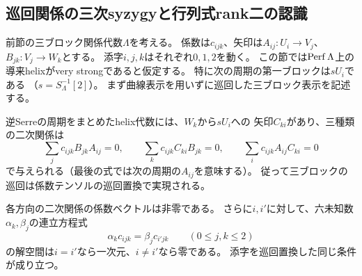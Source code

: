 \subsection{巡回関係の三次syzygyと行列式rank二の認識}
\label{subsec:ou-cyclic-determinants}

前節の三ブロック関係代数$\Lambda$を考える。
係数は$c_{ijk}$、矢印は$A_{ij}:U_i\to V_j$、
$B_{jk}:V_j\to W_k$とする。
添字$i,j,k$はそれぞれ$0,1,2$を動く。
この節では$\operatorname{Perf}\Lambda$上の導来helixがvery strongであると仮定する。
特に次の周期の第一ブロックは$sU_i$である
（$s=S_\Lambda^{-1}[2]$）。
まず曲線表示を用いずに巡回した三ブロック表示を記述する。

\begin{lemma}[巡回表示と三次syzygy]
\label{lem:ou-cyclic-cubic-syzygy}
逆Serreの周期をまとめたhelix代数には、$W_k$から$sU_i$への
矢印$C_{ki}$があり、三種類の二次関係は
\[
 \sum_j c_{ijk}B_{jk}A_{ij}=0,\qquad
 \sum_k c_{ijk}C_{ki}B_{jk}=0,\qquad
 \sum_i c_{ijk}A_{ij}C_{ki}=0
\]
で与えられる（最後の式では次の周期の$A_{ij}$を意味する）。
従って三ブロックの巡回は係数テンソルの巡回置換で実現される。

各方向の二次関係の係数ベクトルは非零である。
さらに$i,i'$に対して、六未知数$\alpha_k,\beta_j$の連立方程式
\begin{equation}\label{eq:ou-cyclic-syzygy}
 \alpha_k c_{ijk}=\beta_j c_{i'jk}
 \qquad(0\leq j,k\leq2)
\end{equation}
の解空間は$i=i'$なら一次元、$i\ne i'$なら零である。
添字を巡回置換した同じ条件が成り立つ。
\end{lemma}

